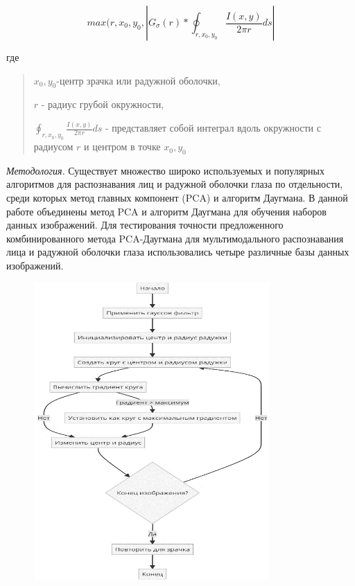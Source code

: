 \[max(r,x_{0},y_{0},\left| G_{\sigma}(r)*\oint_{r,x_{0},y_{0}}\frac{I(x,y)}{2\pi r}ds \right|\]

где

\begin{quote}
\(x_{0},y_{0}\)-центр зрачка или радужной оболочки,

\(r\) - радиус грубой окружности,

\(\oint_{r,x_{0},y_{0}}\frac{I(x,y)}{2\pi r}ds\) - представляет собой
интеграл вдоль окружности с радиусом \(r\) и центром в точке
\(x_{0},y_{0}\)
\end{quote}

\emph{Методология.} Существует множество широко используемых и
популярных алгоритмов для распознавания лиц и радужной оболочки глаза по
отдельности, среди которых метод главных компонент (PCA) и алгоритм
Даугмана. В данной работе объединены метод PCA и алгоритм Даугмана для
обучения наборов данных изображений. Для тестирования точности
предложенного комбинированного метода PCA-Даугмана для мультимодального
распознавания лица и радужной оболочки глаза использовались четыре
различные базы данных изображений.

\begin{figure}[H]
	\centering
	\includegraphics[width=0.8\textwidth]{assets/83}
	\caption*{}
\end{figure}

